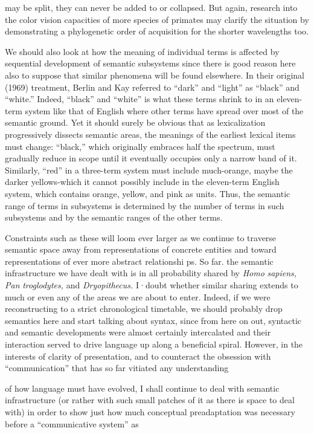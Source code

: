 may be split, they can never be added to or collapsed. But again, research into the color vision capacities of more species of primates may clarify the situation by demonstrating a phylogenetic order of acquisition for the shorter wavelengths too.

We should also look at how the meaning of individual terms is affected by sequential development of semantic subsystems since there is good reason here also to suppose that similar phenomena will be found elsewhere. In their original (1969) treatment, Berlin and Kay referred to ``dark'' and ``light'' as ``black'' and ``white.'' Indeed, ``black'' and ``white'' is what these terms shrink to in an eleven-term system like that of English where other terms have spread over most of the seman\-tic ground. Yet it should surely be obvious that as lexicalization pro\-gressively dissects semantic areas, the meanings of the earliest lexical items must change: ``black,'' which originally embraces half the spec\-trum, must gradually reduce in scope until it eventually occupies only a narrow band of it. Similarly, ``red'' in a three-term system must include much-orange, maybe the darker yellows-which it cannot possibly include in the eleven-term English system, which contains orange, yellow, and pink as units. Thus, the semantic range of terms in subsystems is determined by the number of terms in such subsystems and by the semantic ranges of the other terms.

Constraints such as these will loom ever larger as we continue to traverse semantic space away from representations of concrete entities and toward representations of ever more abstract relationshi ps. So far. the semantic infrastructure we have dealt with is in all probability shared by \textit{Homo} \textit{sapiens,} \textit{Pan} \textit{troglodytes,} and \textit{Dryopithecus.} I·doubt whether similar sharing extends to much or even any of the areas we are about to enter. Indeed, if we were reconstructing to a strict chrono\-logical timetable, we should probably drop semantics here and start talking about syntax, since from here on out, syntactic and semantic developments were almost certainly intercalated and their interaction served to drive language up along a beneficial spiral. However, in the interests of clarity of presentation, and to counteract the obsession with ``communication'' that has so far vitiated any understanding


of how language must have evolved, I shall continue to deal with semantic infrastructure (or rather with such small patches of it as there is space to deal with) in order to show just how much conceptual preadaptation was necessary before a ``communicative system'' as

